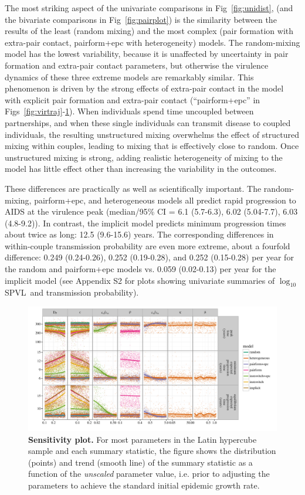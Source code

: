 \documentclass[10pt,letterpaper]{article}
\renewcommand{\figurename}{Fig}
\newcommand{\Lspvl}{$\log_{10}$ SPVL}
\begin{document}
The most striking aspect of the univariate comparisons in
\figurename~\ref{fig:unidist}, (and the bivariate comparisons in
\figurename~\ref{fig:pairplot}) is the similarity between the results of the
least (random mixing) and the most complex (pair formation with
extra-pair contact, pairform+epc with heterogeneity) models. The random-mixing model has the lowest variability, because it is unaffected by uncertainty in pair formation and extra-pair contact parameters, but otherwise the virulence
dynamics of these three extreme models are remarkably similar.
This phenomenon is driven by the strong effects of extra-pair contact in the
model with explicit pair formation and extra-pair contact 
(``pairform+epc'' in \figurename{}s~\ref{fig:virtraj}-\ref{fig:plot_sens}). When individuals spend time uncoupled between
partnerships, and when these single individuals can transmit disease
to coupled individuals, the resulting unstructured mixing overwhelms
the effect of structured mixing within couples, leading to mixing
that is effectively close to random.
Once unstructured mixing is strong, adding realistic heterogeneity
of mixing to the model has little effect other than increasing
the variability in the outcomes.

These differences are practically as well as 
scientifically important. The random-mixing, pairform+epc,
and heterogeneous models all predict rapid
progression to AIDS at the virulence peak
(median/95\% CI = 6.1 (5.7-6.3), 
6.02 (5.04-7.7), 6.03  (4.8-9.2)). 
In contrast, 
the implicit model predicts minimum progression times about twice as long:
12.5 (9.6-15.6) years. The corresponding differences in 
within-couple transmission
probability are even more extreme, about a fourfold difference:
0.249 (0.24-0.26), 0.252 (0.19-0.28), and 0.252 (0.15-0.28) per year for the 
random and pairform+epc models vs. 0.059 (0.02-0.13) per year
for the implicit model (see Appendix S2 for 
plots showing univariate summaries
of \Lspvl\ and transmission probability).

\begin{figure}[!ht]
\includegraphics[width=\textwidth]{../figures/fig5.pdf}
\caption{{\bf Sensitivity plot.}
For most parameters in the Latin hypercube sample and each summary statistic, the figure shows the distribution (points) and trend (smooth line) of the summary statistic as a function of the \emph{unscaled} parameter value, i.e. prior to adjusting the parameters to achieve the standard initial epidemic growth rate.}
\label{fig:plot_sens}
\end{figure}
\end{document}
